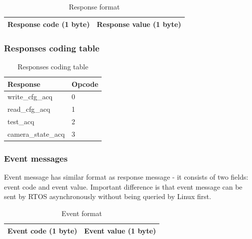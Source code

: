 \begin{table}[H]
\begin{center}
    \begin{tabular}{ | l | l |}
    \hline
    Response code (1 byte) & Response value (1 byte)\\ \hline
    \end{tabular}
    \end{center}
    \caption{Response format}
	\label{table:response_format1}
\end{table}

\subsubsection{Responses coding table}

\begin{table}[H]
\begin{center}
    \begin{tabular}{ | l || l  |}
    \hline
    Response 			& Opcode 	\\ \hline
	write\_cfg\_acq 		& 0 	\\ \hline
	read\_cfg\_acq 			& 1 	\\ \hline
	test\_acq 				& 2 	\\ \hline
	camera\_state\_acq		& 3 	\\ \hline
    \end{tabular}
    \end{center}
    \caption{Responses coding table}
	\label{table:command_enc_table2}
\end{table}

\subsubsection{Event messages}

Event message has similar format as response message - it consists of two fields: event code and event value. Important difference is that event message can be sent by RTOS asynchronously without being queried by Linux first.

\begin{table}[H]
\begin{center}
    \begin{tabular}{ | l | l |}
    \hline
    Event code (1 byte) & Event value (1 byte)\\ \hline
    \end{tabular}
    \end{center}
    \caption{Event format}
	\label{table:response_format2}
\end{table}

